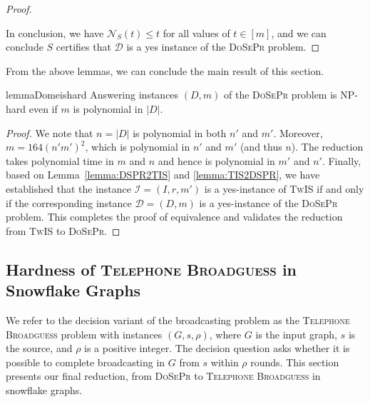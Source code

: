 \documentclass[letterpaper,11pt]{article}
\newcommand{\flower}{snowflake\xspace}
\newcommand{\Flower}{Snowflake\xspace}
\newcommand{\tis}{\textsc{TwIS}\xspace}
\newcommand{\dspr}{\textsc{DoSePr}\xspace}
\newcommand{\cds}{\dspr}
\newcommand{\telebg}{\textsc{Telephone Broadguess}\xspace}
\begin{document}
\begin{proof}
\begin{itemize}
\end{itemize}

 In conclusion, we have $\mathcal{N}_{S}(t)\leq t$ for all values of $t\in[m]$, and we can conclude $S$ certifies that $\mathcal{D}$ is a yes instance of the \dspr problem. 
\end{proof}

From the above lemmas, we can conclude the main result of this section.
\begin{restatable}{lemma}{Domeishard}\label{thm:TIS2DOME}
Answering instances $(D,m)$ of the \dspr problem is NP-hard even if $m$ is polynomial in $|D|$.
\end{restatable}

\begin{proof}
We note that $n=|D|$ is polynomial in both $n'$ and $m'$. Moreover, $m=164(n'm')^2$, which is polynomial in $n'$ and $m'$ (and thus $n$). 
The reduction takes polynomial time in $m$ and $n$ and hence is polynomial in $m'$ and $n'$. Finally, based on Lemma~\ref{lemma:DSPR2TIS} and \ref{lemma:TIS2DSPR}, we have established that the instance $\mathcal{I} = (I,r,m')$ is a yes-instance of \tis if and only if the corresponding instance $\mathcal{D} = (D,m)$ is a yes-instance of the \dspr problem. This completes the proof of equivalence and validates the reduction from \tis to \dspr.
\end{proof}
 \subsection{Hardness of \telebg in \Flower Graphs} \label{subsection:telebghard}

We refer to the decision variant of the broadcasting problem as the \telebg problem with instances $(G,s,\rho)$, where $G$ is the input graph, $s$ is the source, and $\rho$ is a positive integer. The decision question asks whether it is possible to complete broadcasting in $G$ from $s$ within $\rho$ rounds. This section presents our final reduction, from \cds to \telebg in \flower graphs. 
\end{document}
